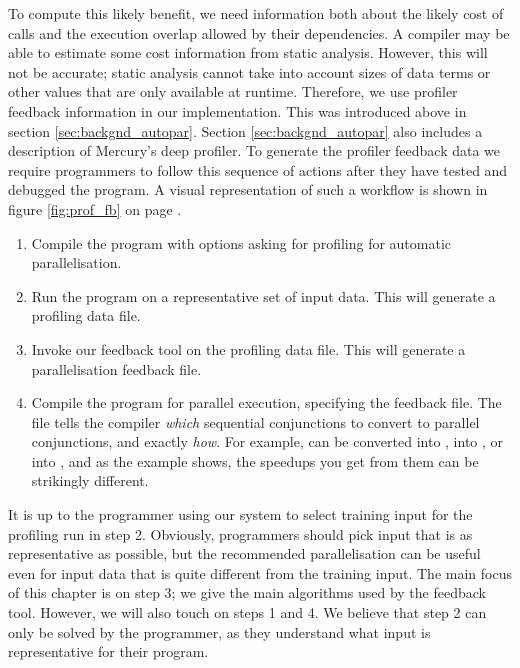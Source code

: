 To compute this likely benefit,
we need information
both about the likely cost of calls
and the execution overlap allowed by their dependencies.
A compiler may be able to estimate some cost information from static
analysis.
However, this will not be accurate;
static analysis cannot take into account sizes of data terms or other
values that are only available at runtime.
Therefore, we use profiler feedback information in our implementation.
This was introduced above in section \ref{sec:backgnd_autopar}.
Section \ref{sec:backgnd_autopar} also includes a description of
Mercury's deep profiler.
To generate the profiler feedback data we require programmers to follow this
sequence of actions after they have tested and debugged the program.
A visual representation of such a workflow is shown in figure
\ref{fig:prof_fb} on page \pageref{fig:prof_fb}.

\begin{enumerate}
\item
Compile the program
with options asking for profiling
for automatic parallelisation.
\item
Run the program on a representative set of input data.
This will generate a profiling data file.
\item
Invoke our feedback tool on the profiling data file.
This will generate a parallelisation feedback file.
\item
Compile the program for parallel execution,
specifying the feedback file.
The file tells the compiler
\emph{which} sequential conjunctions to convert to parallel conjunctions,
and exactly \emph{how}.
For example,  can be converted
into ,
into , or
into ,
and as the  example shows,
the speedups you get from them can be strikingly different.
\end{enumerate}

\noindent
It is up to the programmer using our system
to select training input for the profiling run in step 2.
Obviously, programmers should pick input that is as representative as possible,
but the recommended parallelisation can be useful
even for input data that is quite different from the training input.
The main focus of this chapter is on step 3;
we give the main algorithms used by the feedback tool.
However, we will also touch on steps 1 and 4.
We believe that step 2 can only be solved by the programmer,
as they understand what input is representative for their program.

